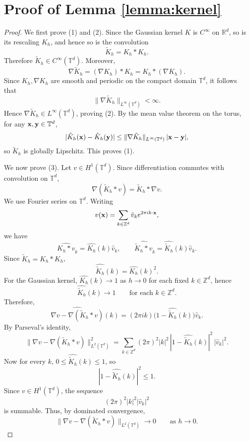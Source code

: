 
\appendix
\section{Proof of Lemma \ref{lemma:kernel}}
\begin{proof}
We first prove (1) and (2). Since the Gaussian kernel \(K\) is \(C^\infty\) on \(\mathbb R^d\), so is its rescaling \(K_h\), and hence so is the convolution
\[
\tilde K_h = K_h * K_h.
\]
Therefore \(\tilde K_h\in C^\infty(\mathbb T^d)\). Moreover,
\[
\nabla \tilde K_h = (\nabla K_h)*K_h = K_h * (\nabla K_h).
\]
Since \(K_h,\nabla K_h\) are smooth and periodic on the compact domain \(\mathbb T^d\), it follows that
\[
\|\nabla \tilde K_h\|_{L^\infty(\mathbb T^d)}<\infty.
\]
Hence \(\nabla \tilde K_h\in L^\infty(\mathbb T^d)\), proving (2). By the mean value theorem on the torus, for any \(\mathbf{x},\mathbf{y}\in\mathbb T^d\),
\[
|\tilde K_h(\mathbf{x})-\tilde K_h(\mathbf{y})|
\le \|\nabla \tilde K_h\|_{L^\infty(\mathbb T^d)}\,|\mathbf{x}-\mathbf{y}|,
\]
so \(\tilde K_h\) is globally Lipschitz. This proves (1).

We now prove (3). Let \(v\in H^1(\mathbb T^d)\). Since differentiation commutes with convolution on \(\mathbb T^d\),
\[
\nabla(\tilde K_h * v)= \tilde K_h * \nabla v.
\]
We use Fourier series on \(\mathbb T^d\). Writing
\[
v(\mathbf{x})=\sum_{k\in\mathbb Z^d}\hat v_k e^{2\pi i k\cdot \mathbf{x}},
\]
we have
\[
\widehat{K_h*v}_k=\widehat{K_h}(k)\hat v_k,
\qquad
\widehat{\tilde K_h*v}_k=\widehat{\tilde K_h}(k)\hat v_k.
\]
Since \(\tilde K_h=K_h*K_h\),
\[
\widehat{\tilde K_h}(k)=\widehat{K_h}(k)^2.
\]
For the Gaussian kernel, \(\widehat{K_h}(k)\to 1\) as \(h\to0\) for each fixed \(k\in\mathbb Z^d\), hence
\[
\widehat{\tilde K_h}(k)\to 1
\qquad\text{for each }k\in\mathbb Z^d.
\]
Therefore,
\[
\widehat{\nabla v-\nabla(\tilde K_h*v)}(k)
=
(2\pi i k)\bigl(1-\widehat{\tilde K_h}(k)\bigr)\hat v_k.
\]
By Parseval's identity,
\[
\|\nabla v-\nabla(\tilde K_h*v)\|_{L^2(\mathbb T^d)}^2
=
\sum_{k\in\mathbb Z^d}
(2\pi)^2 |k|^2\,|1-\widehat{\tilde K_h}(k)|^2\,|\hat v_k|^2.
\]
Now for every \(k\), \(0\le \widehat{\tilde K_h}(k)\le 1\), so
\[
|1-\widehat{\tilde K_h}(k)|^2\le 1.
\]
Since \(v\in H^1(\mathbb T^d)\), the sequence
\[
(2\pi)^2 |k|^2 |\hat v_k|^2
\]
is summable. Thus, by dominated convergence,
\[
\|\nabla v-\nabla(\tilde K_h*v)\|_{L^2(\mathbb T^d)}\to 0
\qquad\text{as }h\to0.
\]


\end{proof}
